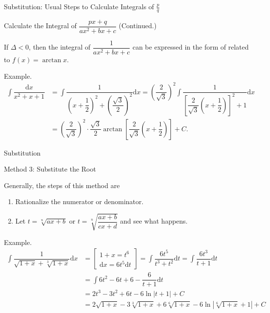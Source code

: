 \documentclass{beamer}
\begin{document}
    \begin{frame}[t]{Substitution: Usual Steps to Calculate Integrals of $\frac{p}{q}$}
        \begin{block}{Calculate the Integral of $\dfrac{px+q}{ax^{2}+bx+c}$ (Continued.)}
            \par If $\Delta< 0$, then the integral of $\dfrac{1}{ax^{2}+bx+c}$ can be expressed in the form of related to $f(x) = \arctan x$.
        \end{block}

        \par \textcolor{yy}{Example.}
        \begin{equation*}
            \begin{aligned}
                \int \dfrac{\mathrm{d} x}{x^{2}+x+1} &= \int \dfrac{1}{\left(x+\dfrac{1}{2}\right)^{2}+\left(\dfrac{\sqrt{3}}{2}\right)^{2}} \mathrm{d} x = \left(\dfrac{2}{\sqrt{3}}\right)^{2} \int \dfrac{1}{\left[\dfrac{2}{\sqrt{3}}\left(x+\dfrac{1}{2}\right)\right]^{2}+1}\mathrm{d}x \\
                &=\left(\dfrac{2}{\sqrt{3}}\right)^{2} \cdot \dfrac{\sqrt{3}}{2} \arctan \left[\dfrac{2}{\sqrt{3}}\left(x+\dfrac{1}{2}\right)\right]+C.
            \end{aligned}
        \end{equation*}
    \end{frame}


    \begin{frame}[t]{Substitution}
        \begin{block}{Method 3: Substitute the Root}
            \par Generally, the steps of this method are
            \begin{enumerate}
                \item Rationalize the numerator or denominator.
                \item Let $t=\sqrt[n]{a x+b} \text { or } t=\sqrt[n]{\dfrac{a x+b}{c x+d}}$ and see what happens.
            \end{enumerate}
        \end{block}
        \textcolor{yy}{Example.} 
        \begin{equation*}
            \begin{aligned}
                \int \dfrac{1}{\sqrt{1+x}+\sqrt[3]{1+x}} \mathrm{d} x & = \left[\begin{array}{c} 1+x=t^6 \\ \mathrm{d}x=6t^5\mathrm{d}t \end{array}\right] =\int \dfrac{6t^5}{t^3+t^2}\mathrm{d}t =\int\dfrac{6t^3}{t+1}\mathrm{d}t \\
                & =\int 6t^2-6t+6-\dfrac{6}{t+1}\mathrm{d}t\\
                & =2t^3-3t^2+6t-6\ln \left|t+1\right|+C\\
                & =2 \sqrt{1+x}-3 \sqrt[3]{1+x}+6 \sqrt[6]{1+x}-6 \ln |\sqrt[6]{1+x}+1|+C
            \end{aligned}
        \end{equation*}
    \end{frame}
\end{document}
